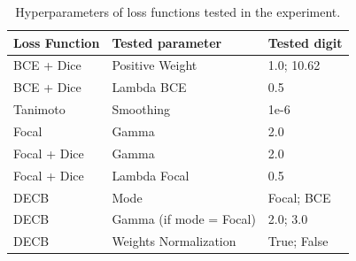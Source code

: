 \begin{table}[!ht]
    \centering
    \begin{tabular}{|l|l|l|}
    \hline
        Loss Function & Tested parameter & Tested digit \\ \hline
        BCE + Dice & Positive Weight & 1.0; 10.62 \\ \hline
        BCE + Dice & Lambda BCE & 0.5 \\ \hline
        Tanimoto & Smoothing & 1e-6 \\ \hline
        Focal & Gamma & 2.0 \\ \hline
        Focal + Dice & Gamma & 2.0 \\ \hline
        Focal + Dice & Lambda Focal & 0.5 \\ \hline
        DECB & Mode & Focal; BCE \\ \hline
        DECB & Gamma (if mode = Focal) & 2.0; 3.0 \\ \hline
        DECB & Weights Normalization & True; False \\ \hline
    \end{tabular}
    \caption{Hyperparameters of loss functions tested in the experiment.}
    \label{app:tab:loss_functions_hyperparameters}
\end{table}
